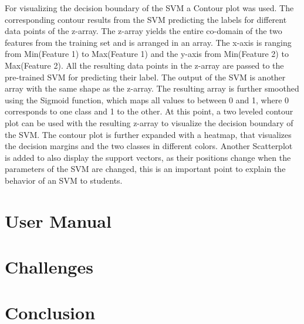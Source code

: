 \documentclass{scrartcl}
\begin{document}
For visualizing the decision boundary of the SVM a Contour plot was used. The corresponding contour results from the SVM predicting the labels for different data points of the z-array. The z-array yields the entire co-domain of the two features from the training set and is arranged in an array. The x-axis is ranging from Min(Feature 1) to Max(Feature 1) and the y-axis from Min(Feature 2) to Max(Feature 2). All the resulting data points in the z-array are passed to the pre-trained SVM for predicting their label. The output of the SVM is another array with the same shape as the z-array. The resulting array is further smoothed using the Sigmoid function, which maps all values to between 0 and 1, where 0 corresponds to one class and 1 to the other. 
At this point, a two leveled contour plot can be used with the resulting z-array  to visualize the decision boundary of the SVM. The contour plot is further expanded with a heatmap, that visualizes the decision margins and the two classes in different colors.
Another Scatterplot is added to also display the support vectors, as their positions change when the parameters of the SVM are changed, this is an important point to explain the behavior of an SVM to students.


\section{User Manual}

\section{Challenges}

\section{Conclusion}
\end{document}
